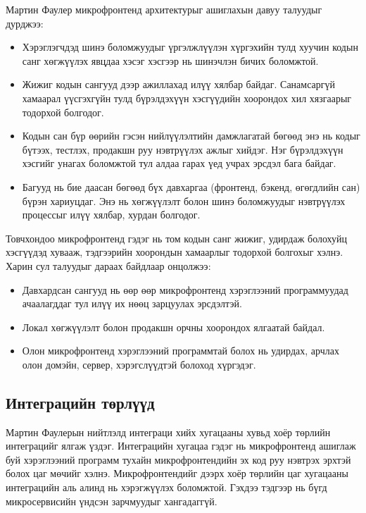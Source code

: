 Мартин Фаулер \cite{fowler_microfrontends} микрофронтенд архитектурыг ашиглахын давуу талуудыг дурджээ:
\begin{itemize}
	\item Хэрэглэгчдэд шинэ боломжуудыг үргэлжлүүлэн хүргэхийн тулд хуучин кодын санг хөгжүүлэх явцдаа хэсэг хэсгээр нь шинэчлэн бичих боломжтой.
	\item Жижиг кодын сангууд дээр ажиллахад илүү хялбар байдаг. Санамсаргүй хамаарал үүсгэхгүйн тулд бүрэлдэхүүн хэсгүүдийн хоорондох хил хязгаарыг тодорхой болгодог.
	\item Кодын сан бүр өөрийн гэсэн нийлүүлэлтийн дамжлагатай бөгөөд энэ нь кодыг бүтээх, тестлэх, продакшн руу нэвтрүүлэх ажлыг хийдэг. Нэг бүрэлдэхүүн хэсгийг унагах боломжтой тул алдаа гарах үед учрах эрсдэл бага байдаг.
	\item Багууд нь бие даасан бөгөөд бүх давхаргаа (фронтенд, бэкенд, өгөгдлийн сан) бүрэн хариуцдаг. Энэ нь хөгжүүлэлт болон шинэ боломжуудыг нэвтрүүлэх процессыг илүү хялбар, хурдан болгодог.
\end{itemize}

Товчхондоо микрофронтенд гэдэг нь том кодын санг жижиг, удирдаж болохуйц хэсгүүдэд хувааж, тэдгээрийн хоорондын хамаарлыг тодорхой болгохыг хэлнэ. Харин сул талуудыг дараах байдлаар онцолжээ:
\begin{itemize}
	\item Давхардсан сангууд нь өөр өөр микрофронтенд хэрэглээний программуудад ачаалагддаг тул илүү их нөөц зарцуулах эрсдэлтэй.
	\item Локал хөгжүүлэлт болон продакшн орчны хоорондох ялгаатай байдал.
	\item Олон микрофронтенд хэрэглээний программтай болох нь удирдах, арчлах олон домэйн, сервер, хэрэгслүүдтэй болоход хүргэдэг.
\end{itemize}

\subsection{Интеграцийн төрлүүд}
\label{sec:integration-types}
Мартин Фаулерын \cite{microfrontends_info} нийтлэлд интеграци хийх хугацааны хувьд хоёр төрлийн интеграцийг ялгаж үздэг. Интеграцийн хугацаа гэдэг нь микрофронтенд ашиглаж буй хэрэглээний программ тухайн микрофронтендийн эх код руу нэвтрэх эрхтэй болох цаг мөчийг хэлнэ. Микрофронтендийг дээрх хоёр төрлийн цаг хугацааны интеграцийн аль алинд нь хэрэгжүүлэх боломжтой. Гэхдээ тэдгээр нь бүгд микросервисийн үндсэн зарчмуудыг хангадаггүй.
